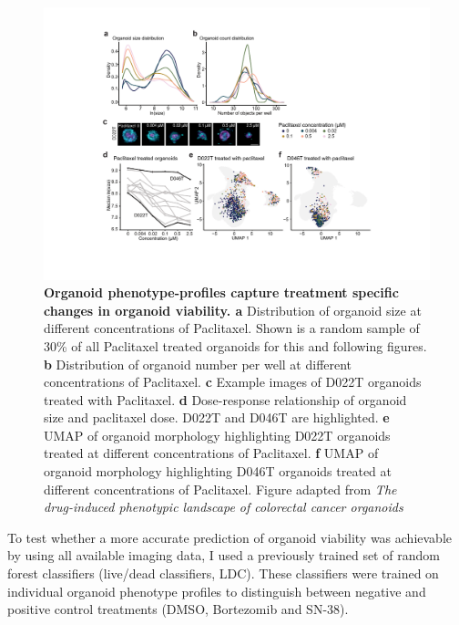 \begin{flushleft}
\begin{figure}[H]
\centering
\includegraphics[width=\textwidth,
                height=\textheight,
                keepaspectratio]{figures/promise/pdf/fig_2_2.pdf}
\caption[Organoid phenotype-profiles capture treatment specific changes in organoid viability]{\textbf{Organoid phenotype-profiles capture treatment specific changes in organoid viability. a} Distribution of organoid size at different concentrations of Paclitaxel. Shown is a random sample of 30\% of all Paclitaxel treated organoids for this and following figures. \textbf{b} Distribution of organoid number per well at different concentrations of Paclitaxel. \textbf{c} Example images of D022T organoids treated with Paclitaxel. \textbf{d} Dose-response relationship of organoid size and paclitaxel dose. D022T and D046T are highlighted. \textbf{e} UMAP of organoid morphology highlighting D022T organoids treated at different concentrations of Paclitaxel. \textbf{f} UMAP of organoid morphology highlighting D046T organoids treated at different concentrations of Paclitaxel. Figure adapted from \textit{The drug-induced phenotypic landscape of colorectal cancer organoids} \cite{Betge2022-kr}}
\label{fig_222}
\end{figure}
\bigbreak

To test whether a more accurate prediction of organoid viability was achievable by using all available imaging data, I used a previously trained set of random forest classifiers (live/dead classifiers, LDC). These classifiers were trained on individual organoid phenotype profiles to distinguish between negative and positive control treatments (DMSO, Bortezomib and SN-38). 


\end{flushleft}
